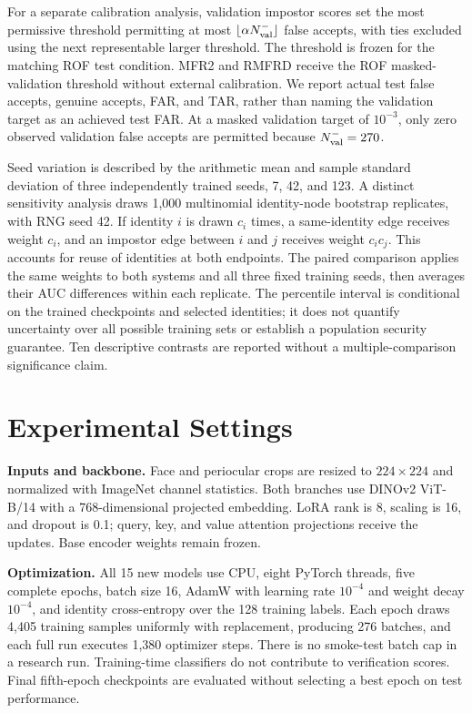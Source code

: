 \documentclass[10pt,journal,compsoc]{IEEEtran}
\begin{document}
For a separate calibration analysis, validation impostor scores set the most permissive threshold permitting at most $\lfloor\alpha N_{\rm val}^{-}\rfloor$ false accepts, with ties excluded using the next representable larger threshold. The threshold is frozen for the matching ROF test condition. MFR2 and RMFRD receive the ROF masked-validation threshold without external calibration. We report actual test false accepts, genuine accepts, FAR, and TAR, rather than naming the validation target as an achieved test FAR. At a masked validation target of $10^{-3}$, only zero observed validation false accepts are permitted because $N_{\rm val}^{-}=270$.

Seed variation is described by the arithmetic mean and sample standard deviation of three independently trained seeds, 7, 42, and 123. A distinct sensitivity analysis draws 1,000 multinomial identity-node bootstrap replicates, with RNG seed 42. If identity $i$ is drawn $c_i$ times, a same-identity edge receives weight $c_i$, and an impostor edge between $i$ and $j$ receives weight $c_i c_j$. This accounts for reuse of identities at both endpoints. The paired comparison applies the same weights to both systems and all three fixed training seeds, then averages their AUC differences within each replicate. The percentile interval is conditional on the trained checkpoints and selected identities; it does not quantify uncertainty over all possible training sets or establish a population security guarantee. Ten descriptive contrasts are reported without a multiple-comparison significance claim.

\section{Experimental Settings}
\textbf{Inputs and backbone.} Face and periocular crops are resized to $224\times224$ and normalized with ImageNet channel statistics. Both branches use DINOv2 ViT-B/14 with a 768-dimensional projected embedding. LoRA rank is 8, scaling is 16, and dropout is 0.1; query, key, and value attention projections receive the updates. Base encoder weights remain frozen.

\textbf{Optimization.} All 15 new models use CPU, eight PyTorch threads, five complete epochs, batch size 16, AdamW with learning rate $10^{-4}$ and weight decay $10^{-4}$, and identity cross-entropy over the 128 training labels. Each epoch draws 4,405 training samples uniformly with replacement, producing 276 batches, and each full run executes 1,380 optimizer steps. There is no smoke-test batch cap in a research run. Training-time classifiers do not contribute to verification scores. Final fifth-epoch checkpoints are evaluated without selecting a best epoch on test performance.
\end{document}
